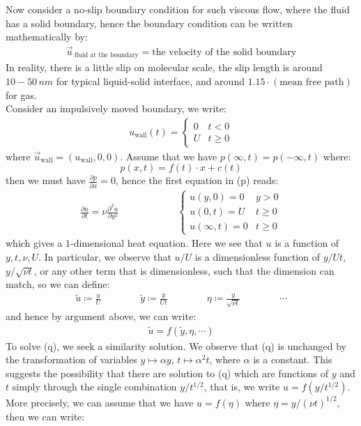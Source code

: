 \documentclass[11pt]{book}
\theoremstyle{break}
\theoremstyle{break}
\newcommand{\that}[1]{\widetilde{#1}}
\begin{document}
Now consider a no-slip boundary condition for such viscous flow, where the fluid has a solid boundary, hence the boundary condition can be written mathematically by:
\begin{align*}
\vec{u}_{\ \text{fluid at the boundary}} = \text{the velocity of the solid boundary}
\end{align*}
In reality, there is a little slip on molecular scale, the slip length is around $10-50\, nm$ for typical liquid-solid interface, and around $1.15\cdot (\text{mean free path})$ for gas.\\
Consider an impulsively moved boundary, we write:
\begin{align*}
u_{\text{wall}}(t) = \begin{cases} 0 & t< 0 \\ 
U & t \geq 0
\end{cases}
\end{align*}
where $\vec{u}_{\text{wall}}= (u_{\text{wall}}, 0,0)$. Assume that we have $p(\infty,t) = p(-\infty,t)$ where: 
$$p(x,t) = f(t)\cdot x + c(t)$$ 
then we must have $\frac{\partial p}{\partial x} = 0$, hence the first equation in (p) reads:
\begin{align*}
\frac{\partial u}{\partial t} = \nu \frac{\partial^2 u}{\partial y^2} \qquad\qquad\qquad \begin{cases}
u(y,0) = 0 & y>0\\
u(0,t) = U & t\geq 0\\
u(\infty, t) = 0 & t\geq 0
\end{cases} \tag{q}
\end{align*}
which gives a $1$-dimensional heat equation. Here we see that $u$ is a function of $y,t,\nu,U$. In particular, we observe that $u/U$ is a dimensionless function of $y/Ut$, $y/\sqrt{\nu t}$, or any other term that is dimensionless, such that the dimension can match, so we can define:
\begin{align*}
\that{u} \coloneqq \frac{u}{U} \qquad\qquad \that{y} \coloneqq \frac{y}{Ut} \qquad\qquad \eta \coloneqq \frac{y}{\sqrt{\nu t}} \qquad\qquad \cdots
\end{align*}
and hence by argument above, we can write:
\begin{align*}
\that{u} = f(\that{y}, \eta, \cdots)
\end{align*}
To solve (q), we seek a similarity solution. We observe that (q) is unchanged by the transformation of variables $y \mapsto \alpha y$, $t\mapsto \alpha^2 t$, where $\alpha$ is a constant. This suggests the possibility that there are solution to (q) which are functions of $y$ and $t$ simply through the single combination $y/t^{1/2}$, that is, we write $u = f(y/t^{1/2})$. More precisely, we can assume that we have $u = f(\eta)$ where $\eta = y/(\nu t)^{1/2}$, then we can write:
\end{document}
